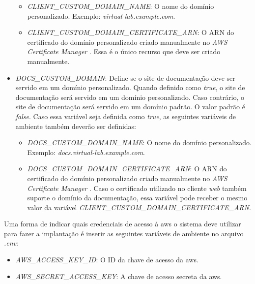 \begin{itemize}
    \begin{itemize}

        \item \textit{CLIENT\_CUSTOM\_DOMAIN\_NAME}: O nome do domínio personalizado. Exemplo: \textit{virtual-lab.example.com}.

        \item \textit{CLIENT\_CUSTOM\_DOMAIN\_CERTIFICATE\_ARN}: O ARN do certificado do domínio personalizado criado manualmente no \textit{AWS Certificate Manager} \citep{awscertificatemanagerdocs}. Essa é o único recurso que deve ser criado manualmente.

    \end{itemize}

    \item \textit{DOCS\_CUSTOM\_DOMAIN}: Define se o site de documentação deve ser servido em um domínio personalizado. Quando definido como \textit{true}, o site de documentação será servido em um domínio personalizado. Caso contrário, o site de documentação será servido em um domínio padrão. O valor padrão é \textit{false}. Caso essa variável seja definida como \textit{true}, as seguintes variáveis de ambiente também deverão ser definidas:

    \begin{itemize}

        \item \textit{DOCS\_CUSTOM\_DOMAIN\_NAME}: O nome do domínio personalizado. Exemplo: \textit{docs.virtual-lab.example.com}.

        \item \textit{DOCS\_CUSTOM\_DOMAIN\_CERTIFICATE\_ARN}: O ARN do certificado do domínio personalizado criado manualmente no \textit{AWS Certificate Manager} \citep{awscertificatemanagerdocs}. Caso o certificado utilizado no cliente \textit{web} também suporte o domínio da documentação, essa variável pode receber o mesmo valor da variável \textit{CLIENT\_CUSTOM\_DOMAIN\_CERTIFICATE\_ARN}.

    \end{itemize}

\end{itemize}

Uma forma de indicar quais credenciais de acesso à \gls{aws} o sistema deve utilizar para fazer a implantação é inserir as seguintes variáveis de ambiente no arquivo \textit{.env}:

\begin{itemize}
    \item \textit{AWS\_ACCESS\_KEY\_ID}: O ID da chave de acesso da \gls{aws}.
    \item \textit{AWS\_SECRET\_ACCESS\_KEY}: A chave de acesso secreta da \gls{aws}.
\end{itemize}

